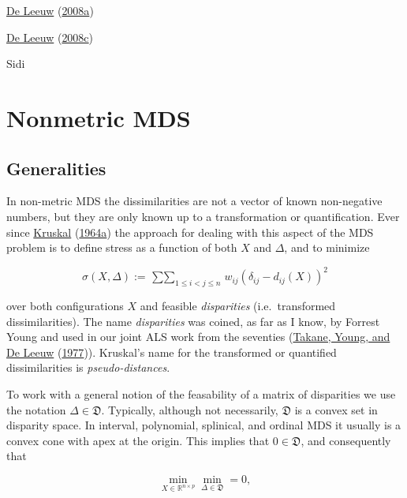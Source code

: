 \documentclass[
  12pt,
]{book}
\theoremstyle{definition}
\theoremstyle{definition}
\theoremstyle{definition}
\theoremstyle{definition}
\theoremstyle{remark}
\begin{document}
\protect\hyperlink{ref-deleeuw_R_08h}{De Leeuw} (\protect\hyperlink{ref-deleeuw_R_08h}{2008a})

\protect\hyperlink{ref-deleeuw_R_08i}{De Leeuw} (\protect\hyperlink{ref-deleeuw_R_08i}{2008c})

Sidi

\hypertarget{nonmtrmds}{%
\chapter{Nonmetric MDS}\label{nonmtrmds}}

\hypertarget{generalities}{%
\section{Generalities}\label{generalities}}

In non-metric MDS the dissimilarities are not a vector of known non-negative numbers,
but they are only known up to a transformation or quantification. Ever since \protect\hyperlink{ref-kruskal_64a}{Kruskal} (\protect\hyperlink{ref-kruskal_64a}{1964a}) the approach for dealing with this aspect of the MDS problem is to define stress as a function of both \(X\) and \(\Delta\), and to minimize

\begin{equation}
\sigma(X,\Delta):=\mathop{\sum\sum}_{1\leq i<j\leq n}w_{ij}(\delta_{ij}-d_{ij}(X))^2
\label{eq:nmstress}
\end{equation}

over both configurations \(X\) and feasible \emph{disparities} (i.e.~transformed
dissimilarities). The name \emph{disparities} was coined, as
far as I know, by Forrest Young and used in our joint ALS work from the seventies
(\protect\hyperlink{ref-takane_young_deleeuw_A_77}{Takane, Young, and De Leeuw} (\protect\hyperlink{ref-takane_young_deleeuw_A_77}{1977})). Kruskal's name for the transformed or
quantified dissimilarities is \emph{pseudo-distances}.

To work with a general notion of the feasability of a matrix of disparities we use the
notation \(\Delta\in\mathfrak{D}\). Typically, although not necessarily,
\(\mathfrak{D}\) is a convex set in disparity space. In interval, polynomial,
splinical, and ordinal MDS it usually is a convex cone with apex at the origin. This implies that \(0\in\mathfrak{D}\), and consequently that

\begin{equation}
\min_{X\in\mathbb{R}^{n\times p}}\min_{\Delta\in\mathfrak{D}}=0,
\label{eq:nmtrivial}
\end{equation}
\end{document}
